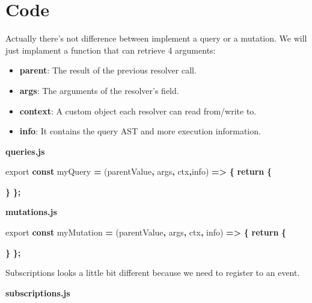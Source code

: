 \documentclass[]{book}
\newenvironment{Shaded}{\begin{snugshade}}{\end{snugshade}}
\newcommand{\KeywordTok}[1]{\textcolor[rgb]{0.13,0.29,0.53}{\textbf{#1}}}
\newcommand{\ImportTok}[1]{#1}
\newcommand{\ControlFlowTok}[1]{\textcolor[rgb]{0.13,0.29,0.53}{\textbf{#1}}}
\newcommand{\OperatorTok}[1]{\textcolor[rgb]{0.81,0.36,0.00}{\textbf{#1}}}
\newcommand{\NormalTok}[1]{#1}
\providecommand{\tightlist}{%
  \setlength{\itemsep}{0pt}\setlength{\parskip}{0pt}}
\begin{document}
\section{Code}\label{code-1}

Actually there's not difference between implement a query or a mutation.
We will just implament a function that can retrieve 4 arguments:

\begin{itemize}
\tightlist
\item
  \textbf{parent}: The result of the previous resolver call.
\item
  \textbf{args}: The arguments of the resolver's field.
\item
  \textbf{context}: A custom object each resolver can read from/write
  to.
\item
  \textbf{info}: It contains the query AST and more execution
  information.
\end{itemize}

\textbf{queries.js}

\begin{Shaded}
\begin{Highlighting}[]

\ImportTok{export} \KeywordTok{const}\NormalTok{ myQuery }\OperatorTok{=}\NormalTok{ (parentValue}\OperatorTok{,}\NormalTok{ args}\OperatorTok{,}\NormalTok{ ctx}\OperatorTok{,}\NormalTok{info) }\OperatorTok{=>} \OperatorTok{\{}
    \ControlFlowTok{return} \OperatorTok{\{}
        
    \OperatorTok{\}}
\OperatorTok{\};}
\end{Highlighting}
\end{Shaded}

\textbf{mutations.js}

\begin{Shaded}
\begin{Highlighting}[]
\ImportTok{export} \KeywordTok{const}\NormalTok{ myMutation }\OperatorTok{=}\NormalTok{ (parentValue}\OperatorTok{,}\NormalTok{ args}\OperatorTok{,}\NormalTok{ ctx}\OperatorTok{,}\NormalTok{ info) }\OperatorTok{=>} \OperatorTok{\{}
    \ControlFlowTok{return} \OperatorTok{\{}
              
    \OperatorTok{\}}
\OperatorTok{\};}
\end{Highlighting}
\end{Shaded}

Subscriptions looks a little bit different because we need to register
to an event.

\textbf{subscriptions.js}
\end{document}
